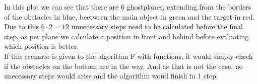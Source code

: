 In this plot we can see that there are 6 ghostplanes, extending from the borders of the obstacles in blue, beetween the main object in green and the target in red. Due to this $6\cdot2 = 12$ unnecessary steps need to be calculated before the final step, as per plane we calculate a position in front and behind before evaluating which position is better.\\
If this scenario is given to the algorithm F with functions, it would simply check if the obstacles on the bottom are in the way. And as that is not the case, no unecessary steps would arise and the algorithm woud finish in 1 step.